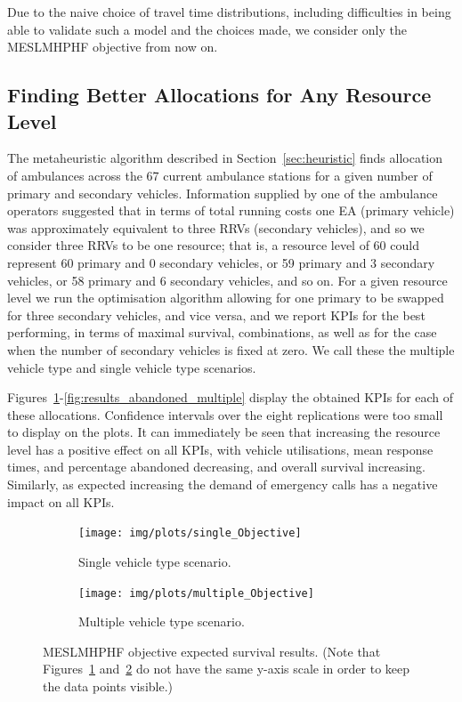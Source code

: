 \documentclass[numbers,webpdf,imaman]{ima-authoring-template}%
\begin{document}
Due to the naive choice of travel time distributions, including difficulties in
being able to validate such a model and the choices made, we consider only the
MESLMHPHF objective from now on.


\subsection{Finding Better Allocations for Any Resource Level}\label{sec:vehicle_numbers}
The metaheuristic algorithm described in Section~\ref{sec:heuristic} finds
allocation of ambulances across the 67 current ambulance stations for a given
number of primary and secondary vehicles. Information supplied by one of the
ambulance operators suggested that in terms of total running costs one EA
(primary vehicle) was approximately equivalent to three RRVs (secondary
vehicles), and so we consider three RRVs to be one resource; that is, a
resource level of 60 could represent 60 primary and 0 secondary vehicles, or
59 primary and 3 secondary vehicles, or 58 primary and 6 secondary vehicles,
and so on. For a given resource level we run the optimisation algorithm allowing
for one primary to be swapped for three secondary vehicles, and vice versa,
and we report KPIs for the best performing, in terms of maximal
survival, combinations, as well as for the case when the number of secondary
vehicles is fixed at zero. We call these the multiple vehicle type and single
vehicle type scenarios.

Figures~\ref{fig:results_objective_single}-\ref{fig:results_abandoned_multiple}
display the obtained KPIs for each of these allocations. Confidence intervals
over the eight replications were too small to display on the plots. It can
immediately be seen that increasing the resource level has a positive effect on
all KPIs, with vehicle utilisations, mean response times, and percentage
abandoned decreasing, and overall survival increasing. Similarly, as expected
increasing the demand of emergency calls has a negative impact on all KPIs.

\begin{figure}[htb!]
\begin{center}
\begin{subfigure}{0.4\textwidth}
\texttt{[image: img/plots/single\_Objective]}
\caption{Single vehicle type scenario.}
\label{fig:results_objective_single}
\end{subfigure}
\begin{subfigure}{0.4\textwidth}
\texttt{[image: img/plots/multiple\_Objective]}
\caption{Multiple vehicle type scenario.}
\label{fig:results_objective_multiple}
\end{subfigure}
\end{center}
\caption{MESLMHPHF objective expected survival results. (Note that Figures~\ref{fig:results_objective_single} and~\ref{fig:results_objective_multiple} do not have the same y-axis scale in order to keep the data points visible.)}
\label{fig:results_objective}
\end{figure}
\end{document}
